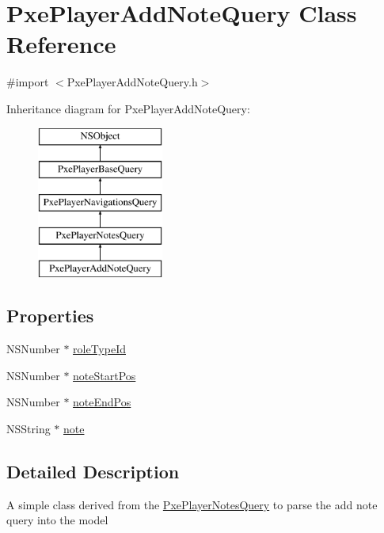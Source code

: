 \hypertarget{interface_pxe_player_add_note_query}{\section{Pxe\-Player\-Add\-Note\-Query Class Reference}
\label{interface_pxe_player_add_note_query}
}


{\ttfamily \#import $<$Pxe\-Player\-Add\-Note\-Query.\-h$>$}

Inheritance diagram for Pxe\-Player\-Add\-Note\-Query\-:\begin{figure}[H]
\begin{center}
\leavevmode
\includegraphics[height=5.000000cm]{interface_pxe_player_add_note_query}
\end{center}
\end{figure}
\subsection*{Properties}
\begin{DoxyCompactItemize}
\item 
N\-S\-Number $\ast$ \hyperlink{interface_pxe_player_add_note_query_ae672dcec8caabe679146321fae6f7249}{role\-Type\-Id}
\item 
N\-S\-Number $\ast$ \hyperlink{interface_pxe_player_add_note_query_a43eaa116777daa69de084d8b82c90022}{note\-Start\-Pos}
\item 
N\-S\-Number $\ast$ \hyperlink{interface_pxe_player_add_note_query_adf1994bd1cad22ee5241e05f8ff1513d}{note\-End\-Pos}
\item 
N\-S\-String $\ast$ \hyperlink{interface_pxe_player_add_note_query_acbba394938104676d54315480c713611}{note}
\end{DoxyCompactItemize}


\subsection{Detailed Description}
A simple class derived from the \hyperlink{interface_pxe_player_notes_query}{Pxe\-Player\-Notes\-Query} to parse the add note query into the model 


